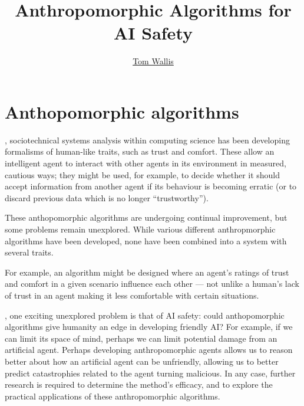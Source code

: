 
\title{Anthropomorphic Algorithms for AI Safety}
\author[Tom Wallis]{\href{http://tom.coffee}{Tom Wallis}}
\date{}



\maketitle

\section{Anthopomorphic algorithms}
, sociotechnical systems analysis within computing science has been developing formalisms of human-like traits, such as trust and comfort. These allow an intelligent agent to interact with other agents in its environment in measured, cautious ways; they might be used, for example, to decide whether it should accept information from another agent if its behaviour is becoming erratic (or to discard previous data which is no longer ``trustworthy''). \par

These anthopomorphic algorithms are undergoing continual improvement\cite{Kramdi}\cite{Urbano2014}, but some problems remain unexplored. While various different anthropmorphic algorithms have been developed, none have been combined into a system with several traits. \par

For example, an algorithm might be designed where an agent's ratings of trust and comfort in a given scenario influence each other --- not unlike a human's lack of trust in an agent making it less comfortable with certain situations.\par

, one exciting unexplored problem is that of AI safety: could anthopomorphic algorithms give humanity an edge in developing friendly AI\@? For example, if we can limit its space of mind\cite{shanahan, sloman_spaceofminds}, perhaps we can limit potential damage from an artificial agent. Perhaps developing anthropomorphic agents allows us to reason better about how an artificial agent can be unfriendly, allowing us to better predict catastrophies related to the agent turning malicious. In any case, further research is required to determine the method's efficacy, and to explore the practical applications of these anthropomorphic algorithms.\par

